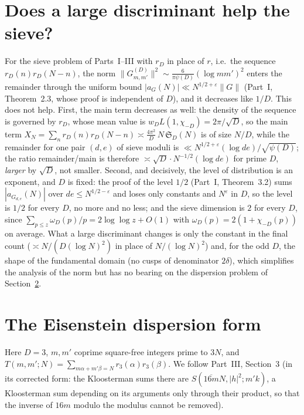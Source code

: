 \documentclass[11pt]{amsart}
\theoremstyle{remark}
\newcommand{\e}{\varepsilon}
\begin{document}
\section{Does a large discriminant help the sieve?}\label{sec:sieve}
For the sieve problem of Parts~I--III with $r_D$ in place of $r$, i.e.\ the sequence $r_D(n)r_D(N-n)$, the norm $\|G^{(D)}_{m,m'}\|^2\sim\frac6{\pi\psi(D)}(\log mm')^2$ enters the remainder through the uniform bound $|a_G(N)|\ll N^{1/2+\e}\|G\|$ (Part~I, Theorem~2.3, whose proof is independent of $D$), and it decreases like $1/D$. This does not help. First, the main term decreases as well: the density of the sequence is governed by $r_D$, whose mean value is $w_DL(1,\chi_{-D})=2\pi/\sqrt D$, so the main term $X_N=\sum_nr_D(n)r_D(N-n)\asymp\frac{4\pi^2}D\,N\,\mathfrak S_D(N)$ is of size $N/D$, while the remainder for one pair $(d,e)$ of sieve moduli is $\ll N^{1/2+\e}(\log de)/\sqrt{\psi(D)}$; the ratio remainder/main is therefore $\asymp\sqrt D\cdot N^{-1/2}(\log de)$ for prime $D$, \emph{larger} by $\sqrt D$, not smaller. Second, and decisively, the level of distribution is an exponent, and $D$ is fixed: the proof of the level $1/2$ (Part~I, Theorem~3.2) sums $|a_{G_{d,e}}(N)|$ over $de\le N^{1/2-\e}$ and loses only constants and $N^\e$ in $D$, so the level is $1/2$ for every $D$, no more and no less; and the sieve dimension is $2$ for every $D$, since $\sum_{p\le z}\omega_D(p)/p=2\log\log z+O(1)$ with $\omega_D(p)=2(1+\chi_{-D}(p))$ on average. What a large discriminant changes is only the constant in the final count ($\asymp N/(D(\log N)^2)$ in place of $N/(\log N)^2$) and, for the odd $D$, the shape of the fundamental domain (no cusps of denominator $2\delta$), which simplifies the analysis of the norm but has no bearing on the dispersion problem of Section~\ref{sec:eis}.

\section{The Eisenstein dispersion form}\label{sec:eis}
Here $D=3$, $m,m'$ coprime square-free integers prime to $3N$, and $T(m,m';N)=\sum_{m\alpha+m'\beta=N}r_3(\alpha)r_3(\beta)$. We follow Part~III, Section~3 (in its corrected form: the Kloosterman sums there are $S(\overline{16m}N,|h|^2;m'k)$, a Kloosterman sum depending on its arguments only through their product, so that the inverse of $16m$ modulo the modulus cannot be removed).
\end{document}
